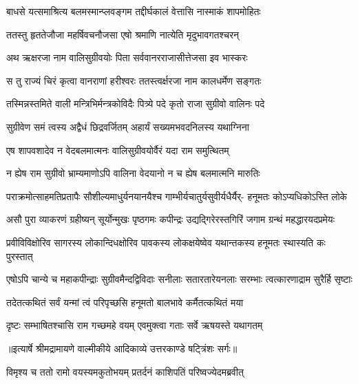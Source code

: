\twolineshloka
{बाधसे यत्समाश्रित्य बलमस्मान्प्लवङ्गम}
{तद्दीर्घकालं वेत्तासि नास्माकं शापमोहितः} %

\twolineshloka
{ततस्तु हृततेजौजा महर्षिवचनौजसा}
{एषो श्रमाणि नात्येति मृदुभावगतश्चरन्} %

\twolineshloka
{अथ ऋक्षरजा नाम वालिसुग्रीवयोः पिता}
{सर्ववानरराजासीत्तेजसा इव भास्करः} %

\twolineshloka
{स तु राज्यं चिरं कृत्वा वानराणां हरीश्वरः}
{ततस्त्वर्क्षरजा नाम कालधर्मेण सङ्गतः} %

\twolineshloka
{तस्मिन्नस्तमिते वाली मन्त्रिभिर्मन्त्रकोविदैः}
{पित्र्ये पदे कृतो राजा सुग्रीवो वालिनः पदे} %

\twolineshloka
{सुग्रीवेण समं त्वस्य अद्वैधं छिद्रवर्जितम्}
{अहार्यं सख्यमभवदनिलस्य यथाग्निना} %

\twolineshloka
{एष शापवशादेव न वेदबलमात्मनः}
{वालिसुग्रीवयोर्वैरं यदा राम समुत्थितम्} %

\twolineshloka
{न ह्येष राम सुग्रीवो भ्राम्यमाणोऽपि वालिना}
{वेदयानो न च ह्येष बलमात्मनि मारुतिः} %

\fourlineindentedshloka
{पराक्रमोत्साहमतिप्रतापैः}
{सौशील्यमाधुर्यनयानयैश्च}
{गाम्भीर्यचातुर्यसुवीर्यधैर्यैर्-}
{हनूमतः कोऽप्यधिकोऽस्ति लोके} %

\fourlineindentedshloka
{असौ पुरा व्याकरणं ग्रहीष्यन्}
{सूर्योन्मुखः पृष्ठगमः कपीन्द्रः}
{उद्यद्गिरेरस्तगिरिं जगाम}
{ग्रन्थं महद्धारयदप्रमेयः} %

\fourlineindentedshloka
{प्रवीविविक्षोरिव सागरस्य}
{लोकान्दिधक्षोरिव पावकस्य}
{लोकक्षयेष्वेव यथान्तकस्य}
{हनूमतः स्थास्यति कः पुरस्तात्} %

\fourlineindentedshloka
{एषोऽपि चान्ये च महाकपीन्द्राः}
{सुग्रीवमैन्दद्विविदाः सनीलाः}
{सतारतारेयनलाः सरम्भाः}
{त्वत्कारणाद्राम सुरैर्हि सृष्टाः} %

\twolineshloka
{तदेतत्कथितं सर्वं यन्मां त्वं परिपृच्छसि}
{हनूमतो बालभावे कर्मैतत्कथितं मया} %

\twolineshloka
{दृष्टः सम्भाषितश्चासि राम गच्छमहे वयम्}
{एवमुक्त्वा गताः सर्वे ऋषयस्ते यथागतम्} %


{॥इत्यार्षे श्रीमद्रामायणे वाल्मीकीये आदिकाव्ये उत्तरकाण्डे षट्त्रिंशः सर्गः॥}


\twolineshloka
{विमृश्य च ततो रामो वयस्यमकुतोभयम्}
{प्रतर्दनं काशिपतिं परिष्वज्येदमब्रवीत्} %

